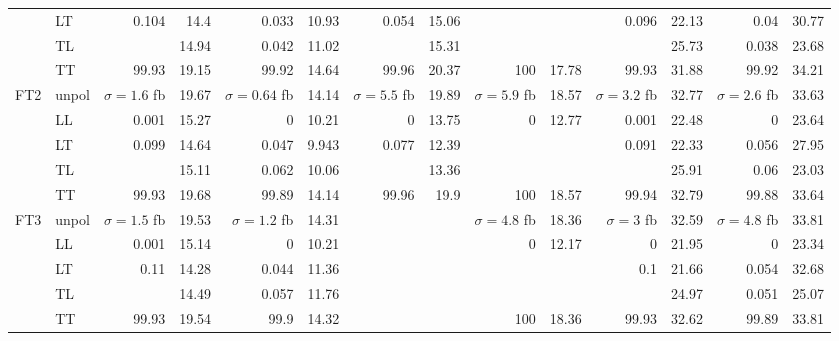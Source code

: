 \begin{table}[h]
{\begin{tabular}{llrrrrrrrrrrrr}
 & LT & \num{0.104} & \num{14.4} & \num{0.033} & \num{10.93} & \num{0.054} & \num{15.06} &  &  & \num{0.096} & \num{22.13} & \num{0.04} & \num{30.77} \\
 & TL &  & \num{14.94} & \num{0.042} & \num{11.02} &  & \num{15.31} &  &  &  & \num{25.73} & \num{0.038} & \num{23.68} \\
 & TT & \num{99.93} & \num{19.15} & \num{99.92} & \num{14.64} & \num{99.96} & \num{20.37} & \num{100} & \num{17.78} & \num{99.93} & \num{31.88} & \num{99.92} & \num{34.21} \\
\midrule
\multirow{5}{*}{FT2}
 & unpol & $\sigma = \num{1.6}$ fb & \num{19.67} & $\sigma = \num{0.64}$ fb & \num{14.14} & $\sigma = \num{5.5}$ fb & \num{19.89} & $\sigma = \num{5.9}$ fb & \num{18.57} & $\sigma = \num{3.2}$ fb & \num{32.77} & $\sigma = \num{2.6}$ fb & \num{33.63} \\
 & LL & \num{0.001} & \num{15.27} & \num{0} & \num{10.21} & \num{0} & \num{13.75} & \num{0} & \num{12.77} & \num{0.001} & \num{22.48} & \num{0} & \num{23.64} \\
 & LT & \num{0.099} & \num{14.64} & \num{0.047} & \num{9.943} & \num{0.077} & \num{12.39} &  &  & \num{0.091} & \num{22.33} & \num{0.056} & \num{27.95} \\
 & TL &  & \num{15.11} & \num{0.062} & \num{10.06} &  & \num{13.36} &  &  &  & \num{25.91} & \num{0.06} & \num{23.03} \\
 & TT & \num{99.93} & \num{19.68} & \num{99.89} & \num{14.14} & \num{99.96} & \num{19.9} & \num{100} & \num{18.57} & \num{99.94} & \num{32.79} & \num{99.88} & \num{33.64} \\
\midrule
\multirow{5}{*}{FT3}
 & unpol & $\sigma = \num{1.5}$ fb & \num{19.53} & $\sigma = \num{1.2}$ fb & \num{14.31} &  &  & $\sigma = \num{4.8}$ fb & \num{18.36} & $\sigma = \num{3}$ fb & \num{32.59} & $\sigma = \num{4.8}$ fb & \num{33.81} \\
 & LL & \num{0.001} & \num{15.14} & \num{0} & \num{10.21} &  &  & \num{0} & \num{12.17} & \num{0} & \num{21.95} & \num{0} & \num{23.34} \\
 & LT & \num{0.11} & \num{14.28} & \num{0.044} & \num{11.36} &  &  &  &  & \num{0.1} & \num{21.66} & \num{0.054} & \num{32.68} \\
 & TL &  & \num{14.49} & \num{0.057} & \num{11.76} &  &  &  &  &  & \num{24.97} & \num{0.051} & \num{25.07} \\
 & TT & \num{99.93} & \num{19.54} & \num{99.9} & \num{14.32} &  &  & \num{100} & \num{18.36} & \num{99.93} & \num{32.62} & \num{99.89} & \num{33.81} \\

\end{tabular}}
\end{table}
